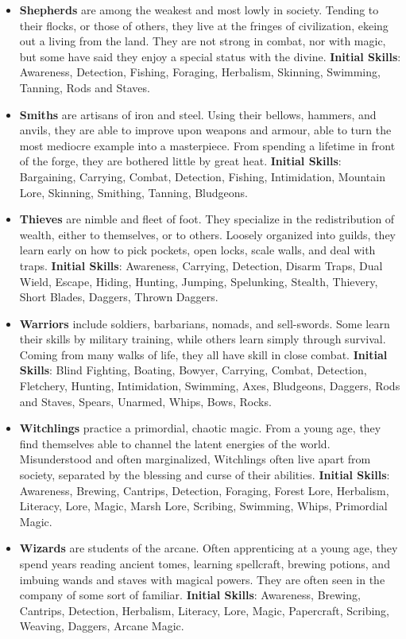 \documentclass{article}
\begin{document}
\begin{itemize}
\item {\bf Shepherds} are among the weakest and most lowly in society.  
Tending to their flocks, or those of others, they live at the fringes of 
civilization, ekeing out a living from the land.  They are not strong in 
combat, nor with magic, but some have said they enjoy a special status 
with the divine.  \textbf{Initial Skills}: Awareness, Detection, Fishing,
Foraging, Herbalism, Skinning, Swimming, Tanning, Rods and Staves.

\item {\bf Smiths} are artisans of iron and steel.  Using their bellows, 
hammers, and anvils, they are able to improve upon weapons and armour, 
able to turn the most mediocre example into a masterpiece.  From spending 
a lifetime in front of the forge, they are bothered little by great heat.
\textbf{Initial Skills}: Bargaining, Carrying, Combat, Detection, 
Fishing, Intimidation, Mountain Lore, Skinning, Smithing, Tanning,
Bludgeons.

\item {\bf Thieves} are nimble and fleet of foot.  They specialize in the 
redistribution of wealth, either to themselves, or to others.  Loosely 
organized into guilds, they learn early on how to pick pockets, open 
locks, scale walls, and deal with traps.  \textbf{Initial Skills}: 
Awareness, Carrying, Detection, Disarm Traps, Dual Wield, Escape, Hiding,
Hunting, Jumping, Spelunking, Stealth, Thievery, Short Blades, Daggers,
Thrown Daggers.

\item {\bf Warriors} include soldiers, barbarians, nomads, and sell-swords.
Some learn their skills by military training, while others learn simply 
through survival.  Coming from many walks of life, they all have skill in 
close combat.  \textbf{Initial Skills}: Blind Fighting, Boating, Bowyer,
Carrying, Combat, Detection, Fletchery, Hunting, Intimidation, Swimming,
Axes, Bludgeons, Daggers, Rods and Staves, Spears, Unarmed, Whips, Bows,
Rocks.

\item {\bf Witchlings} practice a primordial, chaotic magic.  From a young 
age, they find themselves able to channel the latent energies of the 
world.  Misunderstood and often marginalized, Witchlings often live apart 
from society, separated by the blessing and curse of their abilities.
\textbf{Initial Skills}: Awareness, Brewing, Cantrips, Detection, Foraging,
Forest Lore, Herbalism, Literacy, Lore, Magic, Marsh Lore, Scribing,
Swimming, Whips, Primordial Magic.

\item {\bf Wizards} are students of the arcane.  Often apprenticing at a 
young age, they spend years reading ancient tomes, learning spellcraft, 
brewing potions, and imbuing wands and staves with magical powers.  They 
are often seen in the company of some sort of familiar.
\textbf{Initial Skills}: Awareness, Brewing, Cantrips, Detection,
Herbalism, Literacy, Lore, Magic, Papercraft, Scribing, Weaving, Daggers,
Arcane Magic.
\end{itemize}
\end{document}
